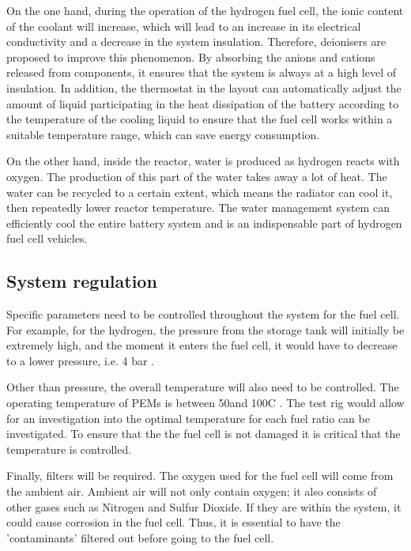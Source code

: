 \documentclass[a4paper,11pt]{article}
\begin{document}
On the one hand, during the operation of the hydrogen fuel cell, the ionic content of the coolant will increase, which will lead to an increase in its electrical conductivity and a decrease in the system insulation\cite{BARGAL2020635}. Therefore, deionisers are proposed to improve this phenomenon. By absorbing the anions and cations released from components, it ensures that the system is always at a high level of insulation. In addition, the thermostat in the layout can automatically adjust the amount of liquid participating in the heat dissipation of the battery according to the temperature of the cooling liquid to ensure that the fuel cell works within a suitable temperature range, which can save energy consumption.

On the other hand, inside the reactor, water is produced as hydrogen reacts with oxygen. The production of this part of the water takes away a lot of heat. The water can be recycled to a certain extent, which means the radiator can cool it, then repeatedly lower reactor temperature. The water management system can efficiently cool the entire battery system and is an indispensable part of hydrogen fuel cell vehicles.

\subsection{System regulation}
Specific parameters need to be controlled throughout the system for the fuel cell. For example, for the hydrogen, the pressure from the storage tank will initially be extremely high, and the moment it enters the fuel cell, it would have to decrease to a lower pressure, i.e. 4 bar \cite{hoeflinger2020air}.

Other than pressure, the overall temperature will also need to be controlled. The operating temperature of PEMs is between 50\degree and 100\degree C \cite{deloitte2020FuelCell}. The test rig would allow for an investigation into the optimal temperature for each fuel ratio can be investigated. To ensure that the the fuel cell is not damaged it is critical that the temperature is controlled.

Finally, filters will be required. The oxygen used for the fuel cell will come from the ambient air. Ambient air will not only contain oxygen; it also consists of other gases such as Nitrogen and Sulfur Dioxide\cite{ozyalcin2021investigation}. If they are within the system, it could cause corrosion in the fuel cell. Thus, it is essential to have the 'contaminants' filtered out before going to the fuel cell.
\end{document}
